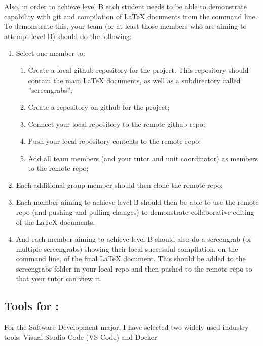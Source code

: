 \documentclass[a4paper, 11pt]{report}
\begin{document}
Also, in order to achieve level B each student needs to be able to demonstrate capability with git and compilation of LaTeX documents from the command line. To demonstrate this, your team (or at least those members who are aiming to attempt level B) should do the following:
\begin{enumerate}
	\item Select one member to:
	\begin{enumerate}
		\item Create a local github repository for the project. This repository should contain the main LaTeX documents, as well as a subdirectory called ''screengrabs'';
		\item Create a repository on github for the project;
		\item Connect your local repository to the remote github repo;
		\item Push your local repository contents to the remote repo;
		\item Add all team members (and your tutor and unit coordinator) as members to the remote repo;
	\end{enumerate}
	\item Each additional group member should then clone the remote repo;
	\item Each member aiming to achieve level B should then be able to use the remote repo (and pushing and pulling changes) to demonstrate collaborative editing of the LaTeX documents.
	\item And each member aiming to achieve level B should also do a screengrab (or multiple screengrabs) showing their local successful compilation, on the command line, of the final LaTeX document. This should be added to the screengrabs folder in your local repo and then pushed to the remote repo so that your tutor can view it.
\end{enumerate}

\subsection{Tools for \majA: \studA}

For the Software Development major, I have selected two widely used industry tools: Visual Studio Code (VS Code) and Docker.
\end{document}
